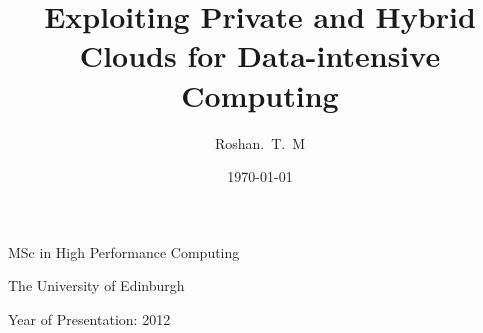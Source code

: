 \documentclass[12pt,a4paper]{report}
\begin{document}

\title{Exploiting Private and Hybrid Clouds for Data-intensive Computing}
\author{Roshan.~T.~M}
\date{\today}

\makeEPCCtitle

\thispagestyle{empty}

\vspace{12cm}

\begin{center}

\large{MSc in High Performance Computing}

\large{The University of Edinburgh}

\large{Year of Presentation: 2012}

\end{center}

\newpage
\end{document}
